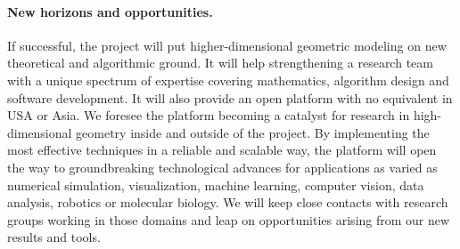 \paragraph{New horizons and opportunities.} 




If successful, the project will put higher-dimensional geometric modeling on new theoretical and algorithmic ground. It will help strengthening a research team with a unique spectrum of expertise covering mathematics, algorithm design and software development.
It will also provide an open platform with no equivalent in USA or Asia. We foresee the platform becoming a catalyst for research in high-dimensional geometry inside and outside of the project.  
By implementing the most effective techniques in a  reliable and scalable way, the platform will
open the way to groundbreaking technological advances for applications as varied as numerical simulation, visualization, machine  learning, computer vision, data analysis, robotics or molecular biology. We will keep close contacts with research groups working in those domains and leap on opportunities arising from our new results and tools.



